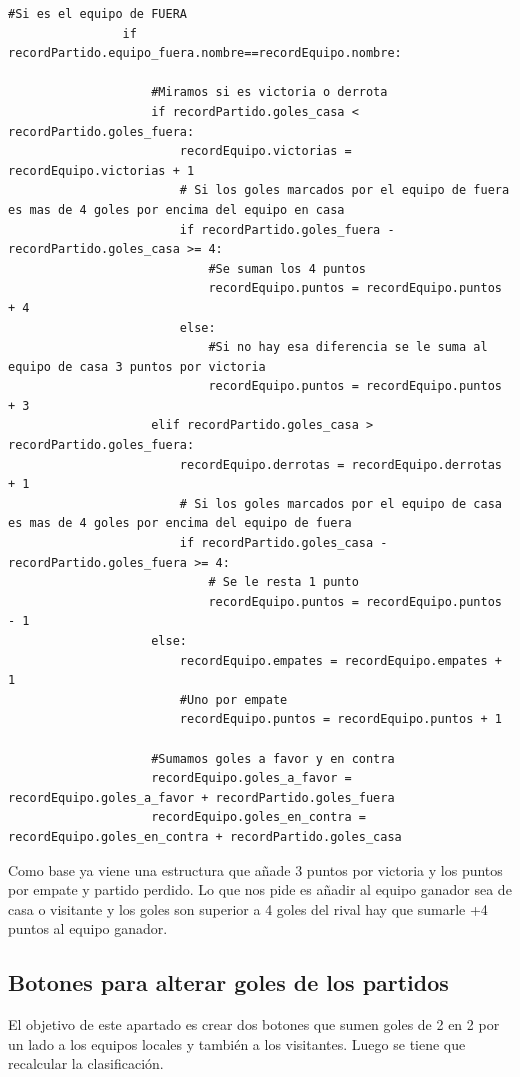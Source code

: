 \documentclass[a4paper,12pt]{article}
\begin{document}
\begin{lstlisting}[style=javascript]
                #Si es el equipo de FUERA
                if recordPartido.equipo_fuera.nombre==recordEquipo.nombre:
                
                    #Miramos si es victoria o derrota
                    if recordPartido.goles_casa < recordPartido.goles_fuera:
                        recordEquipo.victorias = recordEquipo.victorias + 1
                        # Si los goles marcados por el equipo de fuera es mas de 4 goles por encima del equipo en casa
                        if recordPartido.goles_fuera - recordPartido.goles_casa >= 4:
                            #Se suman los 4 puntos
                            recordEquipo.puntos = recordEquipo.puntos + 4
                        else:
                            #Si no hay esa diferencia se le suma al equipo de casa 3 puntos por victoria
                            recordEquipo.puntos = recordEquipo.puntos + 3
                    elif recordPartido.goles_casa > recordPartido.goles_fuera:
                        recordEquipo.derrotas = recordEquipo.derrotas + 1
                        # Si los goles marcados por el equipo de casa es mas de 4 goles por encima del equipo de fuera
                        if recordPartido.goles_casa - recordPartido.goles_fuera >= 4:
                            # Se le resta 1 punto
                            recordEquipo.puntos = recordEquipo.puntos - 1 
                    else:
                        recordEquipo.empates = recordEquipo.empates + 1
                        #Uno por empate
                        recordEquipo.puntos = recordEquipo.puntos + 1
                    
                    #Sumamos goles a favor y en contra
                    recordEquipo.goles_a_favor = recordEquipo.goles_a_favor + recordPartido.goles_fuera
                    recordEquipo.goles_en_contra = recordEquipo.goles_en_contra + recordPartido.goles_casa
\end{lstlisting}

Como base ya viene una estructura que añade 3 puntos por victoria y los puntos por empate y partido perdido. Lo que nos pide es añadir al equipo ganador sea de casa o visitante y los goles son superior a 4 goles del rival hay que sumarle +4 puntos al equipo ganador.

\vspace{1.5cm}
\subsection{Botones para alterar goles de los partidos}
El objetivo de este apartado es crear dos botones que sumen goles de 2 en 2 por un lado a los equipos locales y también a los visitantes. Luego se tiene que recalcular la clasificación.
\end{document}

